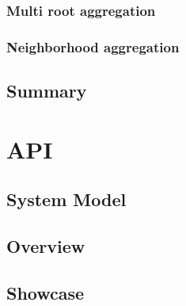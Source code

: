 \subsubsection{Multi root aggregation}

\subsubsection{Neighborhood aggregation}

\subsection{Summary}

\section{API}

\subsection{System Model}

\subsection{Overview}

\subsection{Showcase}
